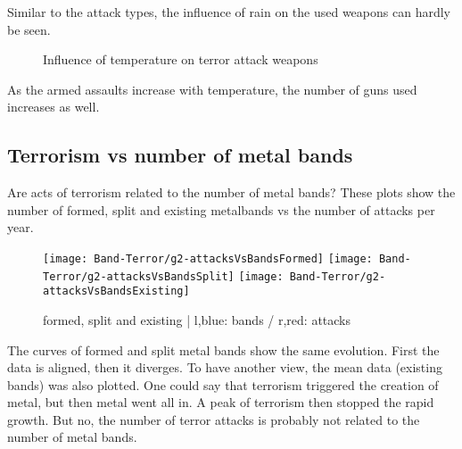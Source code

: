 Similar to the attack types, the influence of rain  on the used weapons can hardly be seen.


\newpage

\begin{figure}[!ht]
\centering
    \qquad
    \qquad
    \qquad
    \qquad
    \qquad
\caption{Influence of temperature on terror attack weapons}
\label{fig:example subfigure}
\end{figure}

As the armed assaults increase with temperature, the number of guns used increases as well.





\subsection{Terrorism vs number of metal bands}
Are acts of terrorism related to the number of metal bands? These plots show the number of formed, split and existing metalbands vs the number of attacks per year.
\begin{figure}[hbt!]
	\texttt{[image: Band-Terror/g2-attacksVsBandsFormed]}
	\centering
	\texttt{[image: Band-Terror/g2-attacksVsBandsSplit]}
	\texttt{[image: Band-Terror/g2-attacksVsBandsExisting]}
	\caption{formed, split and existing | l,blue: bands / r,red: attacks}
\end{figure}
The curves of formed and split metal bands show the same evolution. First the data is aligned, then it diverges. To have another view, the mean data (existing bands) was also plotted. One could say that terrorism triggered the creation of metal, but then metal went all in. A peak of terrorism then stopped the rapid growth. But no, the number of terror attacks is probably not related to the number of metal bands.


